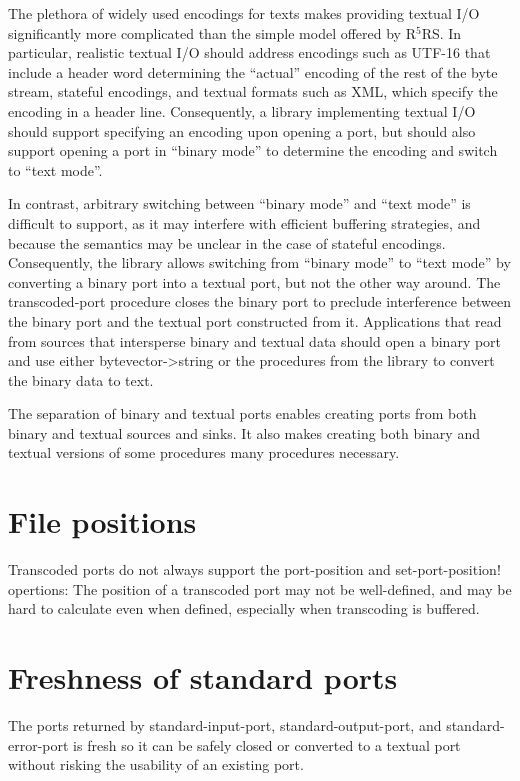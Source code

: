 \documentclass[twoside,twocolumn]{algol60}
\newcommand{\rn}[1]{R$^{#1}$RS}
\begin{document}
The plethora of widely used encodings for texts makes providing
textual I/O significantly more complicated than the simple model
offered by \rn{5}.  In particular, realistic textual I/O should
address encodings such as UTF-16 that include a header word
determining the ``actual'' encoding of the rest of the byte stream,
stateful encodings, and textual formats such as XML, which specify the
encoding in a header line.  Consequently, a library implementing
textual I/O should support specifying an encoding upon opening a port,
but should also support opening a port in ``binary mode'' to determine
the encoding and switch to ``text mode''.

In contrast, arbitrary switching between ``binary mode'' and ``text
mode'' is difficult to support, as it may interfere with efficient
buffering strategies, and because the semantics may be unclear in the
case of stateful encodings.  Consequently, the 
library allows switching from ``binary mode'' to ``text mode'' by
converting a binary port into a textual port, but not the other way
around.  The {\cf transcoded-port} procedure closes the binary port to
preclude interference between the binary port and the textual port
constructed from it.  Applications that read from sources that
intersperse binary and textual data should open a binary port and use
either {\cf bytevector->string} or the procedures from the
 library to convert the binary data to text.

The separation of binary and textual ports enables creating ports from
both binary and textual sources and sinks.  It also makes creating
both binary and textual versions of some procedures many procedures
necessary.

\section{File positions}

Transcoded ports do not always support the {\cf port-position} and
{\cf set-port-position!} opertions: The position of a transcoded port
may not be well-defined, and may be hard to calculate even when
defined, especially when transcoding is buffered.

\section{Freshness of standard ports}

The ports returned by {\cf standard-input-port}, {\cf
  standard-output-port}, and {\cf standard-error-port} is fresh so it
can be safely closed or converted to a textual port without risking
the usability of an existing port.
\end{document}
